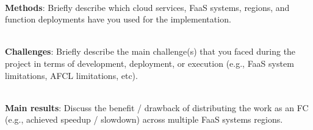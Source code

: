 \vspace{20 pt}

\\\textbf{Methods}: Briefly describe which cloud services, FaaS systems, regions, and function deployments have you used for the implementation.

\vspace{20 pt}

\\\textbf{Challenges}: Briefly describe the main challenge(s) that you faced during the project in terms of development, deployment, or execution (e.g., FaaS system limitations, AFCL limitations, etc).


\vspace{10 pt}

\\\textbf{Main results}: Discuss the benefit / drawback of distributing the work as an FC (e.g., achieved speedup / slowdown) across multiple FaaS systems regions.


